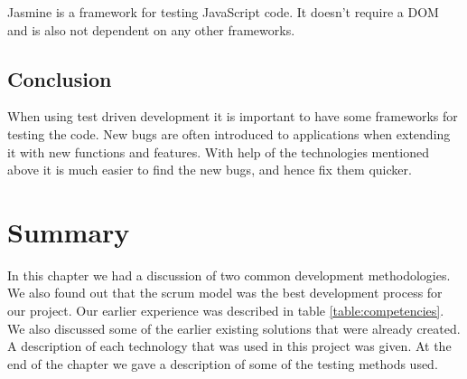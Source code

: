 Jasmine is a framework for testing JavaScript code.	
It doesn't require a DOM and is also not dependent on any other frameworks.

\subsection{Conclusion}

When using test driven development it is important to have some frameworks for testing the code.
New bugs are often introduced to applications when extending it with new functions and features.
With help of the technologies mentioned above it is much easier to find the new bugs, and hence fix them quicker.


\section{Summary}
\label{section:summary}

In this chapter we had a discussion of two common development methodologies.
We also found out that the scrum model was the best development process for our project.
Our earlier experience was described in table \ref{table:competencies}.
We also discussed some of the earlier existing solutions that were already created.
A description of each technology that was used in this project was given. 
At the end of the chapter we gave a description of some of the testing methods used.